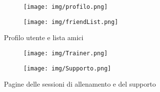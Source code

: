 \documentclass[12pt, a4paper]{article}
\begin{document}
\begin{figure}[h]
    \centering
    \begin{subfigure}[b]{0.45\textwidth}
        \texttt{[image: img/profilo.png]}
    \end{subfigure}
    \hfill
    \begin{subfigure}[b]{0.45\textwidth}
        \texttt{[image: img/friendList.png]}
    \end{subfigure}
    \caption{Profilo utente e lista amici}
\end{figure}

\begin{figure}[h]
    \centering
    \begin{subfigure}[b]{0.45\textwidth}
        \texttt{[image: img/Trainer.png]}
    \end{subfigure}
    \hfill
    \begin{subfigure}[b]{0.45\textwidth}
        \texttt{[image: img/Supporto.png]}
    \end{subfigure}
    \caption{Pagine delle sessioni di allenamento e del supporto}
\end{figure}
\end{document}
